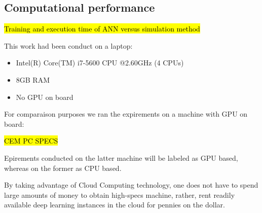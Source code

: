 \documentclass[draft, 10pt]{IEEEtran}
\begin{document}
\subsection{Computational performance}

\hl{Training and execution time of ANN versus simulation method}


This work had been conduct on a  laptop: 

\begin{itemize}
\item Intel(R) Core(TM) i7-5600 CPU @2.60GHz (4 CPUs)
\item 8GB RAM
\item No GPU on board
\end{itemize}

For comparaison purposes we ran the expirements on a machine with GPU on board:

\hl{CEM PC SPECS}

Epirements conducted on the latter machine will be labeled as GPU based, whereas on the former as CPU based.

By taking advantage of Cloud Computing technology, one does not have to spend large amounts of money to obtain high-specs machine, rather, rent readily available deep learning instances in the cloud for pennies on the dollar. 
\end{document}
